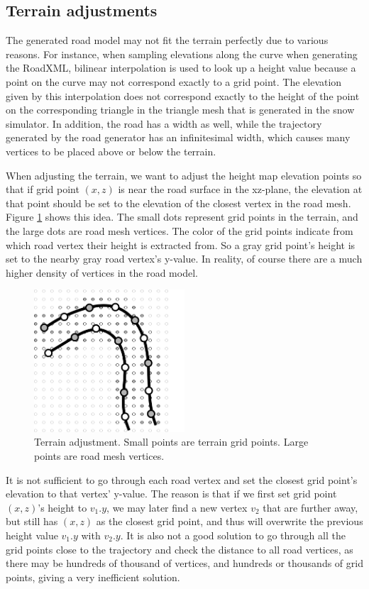 \subsection{Terrain adjustments}
The generated road model may not fit the terrain perfectly due to various reasons. For instance, when sampling elevations along the curve when generating the RoadXML, bilinear interpolation is used to look up a height value because a point on the curve may not correspond exactly to a grid point. The elevation given by this interpolation does not correspond exactly to the height of the point on the corresponding triangle in the triangle mesh that is generated in the snow simulator. In addition, the road has a width as well, while the trajectory generated by the road generator has an infinitesimal width, which causes many vertices to be placed above or below the terrain.

When adjusting the terrain, we want to adjust the height map elevation points so that if grid point $(x,z)$ is near the road surface in the xz-plane, the elevation at that point should be set to the elevation of the closest vertex in the road mesh. Figure \ref{fig:terrain_adjustment} shows this idea. The small dots represent grid points in the terrain, and the large dots are road mesh vertices. The color of the grid points indicate from which road vertex their height is extracted from. So a gray grid point's height is set to the nearby gray road vertex's y-value. In reality, of course there are a much higher density of vertices in the road model.

\begin{figure}[ht]
\centering
\includegraphics[width=0.5\textwidth]{figure/terrain_adjustment}
\caption{Terrain adjustment. Small points are terrain grid points. Large points are road mesh vertices.}
\label{fig:terrain_adjustment}
\end{figure}

It is not sufficient to go through each road vertex and set the closest grid point's elevation to that vertex' y-value. The reason is that if we first set grid point $(x,z)$'s height to $v_1.y$, we may later find a new vertex $v_2$ that are further away, but still has $(x,z)$ as the closest grid point, and thus will overwrite the previous height value $v_1.y$ with $v_2.y$. It is also not a good solution to go through all the grid points close to the trajectory and check the distance to all road vertices, as there may be hundreds of thousand of vertices, and hundreds or thousands of grid points, giving a very inefficient solution. 

